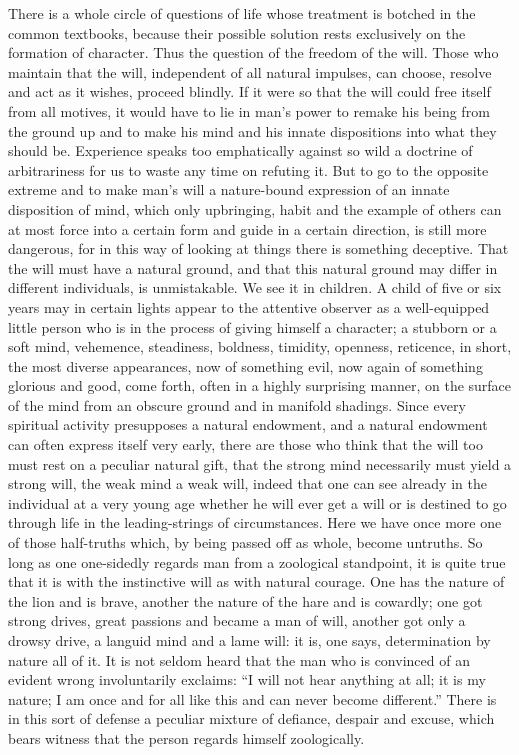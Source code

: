 \documentclass[12pt,a4paper,openany]{book}
\newcommand{\opage}[1]{\marginnote{\footnotesize\textit{[#1]}}}
\begin{document}
There is a whole circle of questions of life whose treatment
is botched in the common textbooks, because their
possible solution rests exclusively on the formation of character.
Thus the question of the freedom of the will. Those who maintain
that the will, independent of all natural impulses, can
choose, resolve and act as it wishes, proceed blindly.
If it were so that the will could free itself
from all motives, it would have to lie in man's
power to remake his being from the ground up and to make his
mind and his innate dispositions into what they should be.
Experience speaks too emphatically against so wild a doctrine of arbitrariness
for us to waste any time on
refuting it. But to go to the opposite extreme
and to make man's will a nature-bound expression of
an innate disposition of mind, which only upbringing, habit and the example of others
can at most force into a certain
form and guide in a certain direction, is still more dangerous, for in
this way of looking at things there is something deceptive. That the will
\setcounter{footnote}{0}%
\opage{495}must have a natural ground, and that this natural ground may
differ in different individuals, is unmistakable.
We see it in children. A child of five
or six years may in certain lights appear to the attentive
observer as a well-equipped little person
who is in the process of giving himself a character; a stubborn
or a soft mind, vehemence, steadiness, boldness, timidity,
openness, reticence, in short, the most diverse
appearances, now of something evil, now again of something
glorious and good, come forth, often in a highly surprising
manner, on the surface of the mind from an obscure ground
and in manifold shadings. Since every spiritual
activity presupposes a natural endowment, and a natural endowment
can often express itself very early, there are
those who think that the will too must rest on a peculiar
natural gift, that the strong mind necessarily must yield
a strong will, the weak mind a weak will, indeed that one
can see already in the individual at a very young age whether
he will ever get a will or is destined to
go through life in the leading-strings of circumstances.
Here we have once more one of those half-truths which, by
being passed off as whole, become untruths. So long as one
one-sidedly regards man from a zoological standpoint,
it is quite true that it is with the
instinctive will as with natural courage. One has
the nature of the lion and is brave, another the nature of the hare and
is cowardly; one got strong drives, great passions and became
a man of will, another got only a drowsy drive,
a languid mind and a lame will: it is, one says, determination by nature
all of it. It is not seldom heard that the man
who is convinced of an evident wrong involuntarily
\setcounter{footnote}{0}%
\opage{496}exclaims: ``I will not hear anything at all; it is my nature;
I am once and for all like this and can never become different.''
There is in this sort of defense a peculiar mixture
of defiance, despair and excuse, which bears witness
that the person regards himself zoologically.
\end{document}
